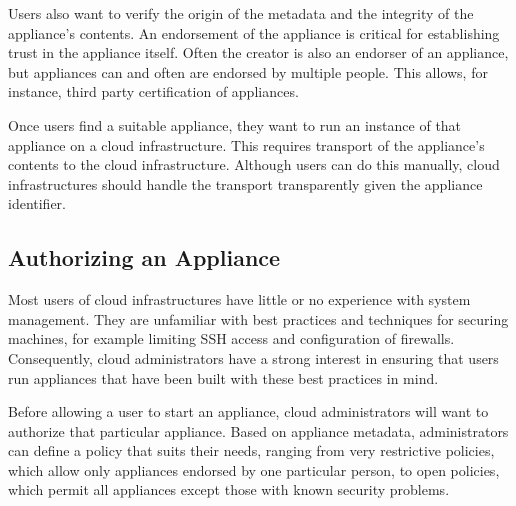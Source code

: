 Users also want to verify the origin of the metadata and the integrity
of the appliance's contents.  An endorsement of the appliance is
critical for establishing trust in the appliance itself.  Often the
creator is also an endorser of an appliance, but appliances can and
often are endorsed by multiple people.  This allows, for instance,
third party certification of appliances.

Once users find a suitable appliance, they want to run an instance of
that appliance on a cloud infrastructure.  This requires transport of
the appliance's contents to the cloud infrastructure.  Although users
can do this manually, cloud infrastructures should handle the
transport transparently given the appliance identifier.

\subsection{Authorizing an Appliance}

Most users of cloud infrastructures have little or no experience with
system management.  They are unfamiliar with best practices and
techniques for securing machines, for example limiting SSH access and
configuration of firewalls.  Consequently, cloud administrators have a
strong interest in ensuring that users run appliances that have been
built with these best practices in mind.

Before allowing a user to start an appliance, cloud administrators
will want to authorize that particular appliance.  Based on appliance
metadata, administrators can define a policy that suits their needs,
ranging from very restrictive policies, which allow only appliances
endorsed by one particular person, to open policies, which permit all
appliances except those with known security problems.
